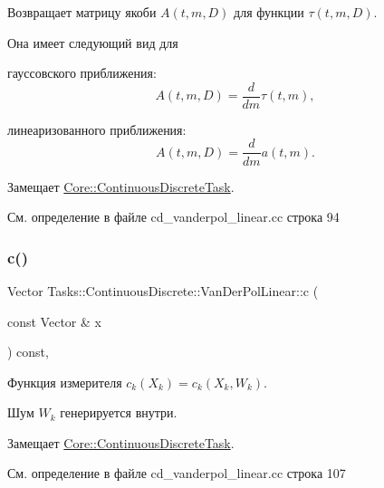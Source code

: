 Возвращает матрицу якоби $A(t, m, D)$ для функции $\tau(t, m, D)$. 

Она имеет следующий вид для


\begin{DoxyItemize}
\item гауссовского приближения\+: \[A(t, m, D) = \frac{d}{dm} \tau(t, m),\]
\item линеаризованного приближения\+: \[A(t, m, D) = \frac{d}{dm} a(t, m).\] 
\end{DoxyItemize}

Замещает \hyperlink{class_core_1_1_continuous_discrete_task_a332d99b61aabb919bffe75d0eec05cfe}{Core\+::\+Continuous\+Discrete\+Task}.



См. определение в файле cd\+\_\+vanderpol\+\_\+linear.\+cc строка 94

\hypertarget{class_tasks_1_1_continuous_discrete_1_1_van_der_pol_linear_af2602ff749602f29f5169ea0e1b391ed}{}\label{class_tasks_1_1_continuous_discrete_1_1_van_der_pol_linear_af2602ff749602f29f5169ea0e1b391ed} 
\subsubsection{\texorpdfstring{c()}{c()}}
{\footnotesize\ttfamily Vector Tasks\+::\+Continuous\+Discrete\+::\+Van\+Der\+Pol\+Linear\+::c (\begin{DoxyParamCaption}\item[{const Vector \&}]{x }\end{DoxyParamCaption}) const\hspace{0.3cm}{\ttfamily [override]}, {\ttfamily [virtual]}}



Функция измерителя $c_k(X_k) = c_k(X_k, W_k)$. 

Шум $W_k$ генерируется внутри. 

Замещает \hyperlink{class_core_1_1_continuous_discrete_task_a64ea27bc1e2a9e6bf1401fc7622c9aea}{Core\+::\+Continuous\+Discrete\+Task}.



См. определение в файле cd\+\_\+vanderpol\+\_\+linear.\+cc строка 107

\hypertarget{class_tasks_1_1_continuous_discrete_1_1_van_der_pol_linear_ac624f91abb5e440d9b05835ca281f53f}{}\label{class_tasks_1_1_continuous_discrete_1_1_van_der_pol_linear_ac624f91abb5e440d9b05835ca281f53f} 
